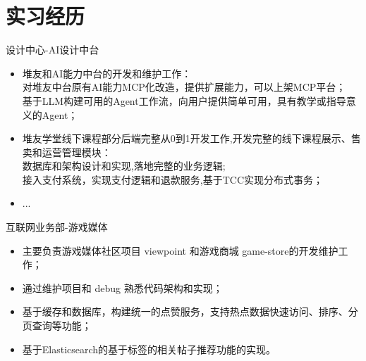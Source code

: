 \documentclass{resume}
\begin{document}
\section{实习经历}
\Content
{{设计中心-AI设计中台}}
{
    \begin{itemize}
        \item 堆友和AI能力中台的开发和维护工作：\\ 对堆友中台原有AI能力MCP化改造，提供扩展能力，可以上架MCP平台；\\ 基于LLM构建可用的Agent工作流，向用户提供简单可用，具有教学或指导意义的Agent；
        \item 堆友学堂线下课程部分后端完整从0到1开发工作,开发完整的线下课程展示、售卖和运营管理模块：\\
        数据库和架构设计和实现,落地完整的业务逻辑;\\
        接入支付系统，实现支付逻辑和退款服务,基于TCC实现分布式事务；
        \item ...
    \end{itemize}
}
\Content
{{互联网业务部-游戏媒体}}
{
    \begin{itemize}
        \item 主要负责游戏媒体社区项目 viewpoint 和游戏商城 game-store的开发维护工作；
        \item 通过维护项目和 debug 熟悉代码架构和实现；
        \item 基于缓存和数据库，构建统一的点赞服务，支持热点数据快速访问、排序、分页查询等功能；
        \item 基于Elasticsearch的基于标签的相关帖子推荐功能的实现。
    \end{itemize}
}

\sepspace
\end{document}
